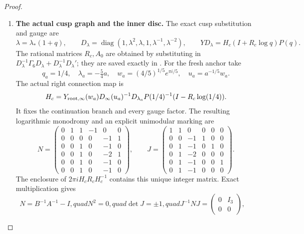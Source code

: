 \begin{proof}
\begin{enumerate}[label=\arabic*.]
Each output leaf records its full quadtree address, exact rational
rectangle, geometric reason or outward height endpoints, and
selected real minor.  A second program reconstructs every rectangle
from its address, checks prefix freeness and
$\sum4^{-\mathrm{depth}}=1$, and checks the exact areas
$2401/2500,2401/2500,1/8,10609/10000$ of the four seeds.
It separately rechecks all geometric exclusions and all serialized
strict endpoint comparisons.  These finite checks prove that no
required box or boundary is omitted.  They check the saved finite
certificate; the interval ODE program supplies its height bounds.

\item \textbf{The actual cusp graph and the inner disc.}
The exact cusp substitution and gauge are
\[
 \lambda=\lambda_*(1+q),\qquad
 D_\lambda=\operatorname{diag}(1,\lambda^2,\lambda,1,
                                  \lambda^{-1},\lambda^{-2}),
 \qquad YD_\lambda=H_c(I+R_c\log q)P(q).
\]
The rational matrices $R_c,A_0$ are obtained by substituting in
$D_\lambda^{-1}\Gamma_6D_\lambda+D_\lambda^{-1}D_\lambda'$;
they are saved exactly in
.
For the fresh anchor take
\[
 q_a=1/4,\quad\lambda_a=-\tfrac54a,\quad
 w_a=(4/5)^{1/5}e^{\pi i/5},\quad u_a=a^{-1/5}w_a.
\]
The actual right connection map is
\[
 H_c=Y_{\rm root,\infty}(w_a)
       D_\infty(u_a)^{-1}D_{\lambda_a}
       P(1/4)^{-1}(I-R_c\log(1/4)).
\]
It fixes the continuation branch and every gauge factor.
The resulting logarithmic monodromy and an explicit unimodular
marking are
\[
 N=\begin{pmatrix}
 0&1&1&-1&0&0\\0&0&0&0&-1&1\\0&0&1&0&-1&0\\
 0&0&1&0&-2&1\\0&0&1&0&-1&0\\0&0&1&0&-1&0
 \end{pmatrix},\qquad
 J=\begin{pmatrix}
 1&1&0&0&0&0\\0&0&-1&1&0&0\\0&1&-1&0&1&0\\
 0&1&-2&0&0&0\\0&1&-1&0&0&1\\0&1&-1&0&0&0
 \end{pmatrix}.
\]
The enclosure of $2\pi iH_cR_cH_c^{-1}$ contains this unique
integer matrix. Exact multiplication gives
\[
 N=B^{-1}A^{-1}-I,quad N^2=0,quad\det J=\pm1,quad
 J^{-1}NJ=\begin{pmatrix}0&I_3\\0&0\end{pmatrix},\quad
\]
\end{enumerate}
\end{proof}
